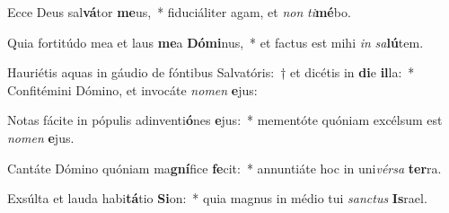 \item Ecce Deus sal\textbf{vá}tor \textbf{me}us,~* fiduciáliter agam, et \textit{non} \textit{ti}\textbf{mé}bo.
\item Quia fortitúdo mea et laus \textbf{me}a \textbf{Dó}\textbf{mi}nus,~* et factus est mihi \textit{in} \textit{sa}\textbf{lú}tem.
\item Hauriétis aquas in gáudio de fóntibus Salvatóris:~† et dicétis in \textbf{di}e \textbf{il}la:~* Confitémini Dómino, et invocáte \textit{no}\textit{men} \textbf{e}jus:
\item Notas fácite in pópulis adinventi\textbf{ó}nes \textbf{e}jus:~* mementóte quóniam excélsum est \textit{no}\textit{men} \textbf{e}jus.
\item Cantáte Dómino quóniam ma\textbf{gní}fice \textbf{fe}cit:~* annuntiáte hoc in uni\textit{vér}\textit{sa} \textbf{ter}ra.
\item Exsúlta et lauda habi\textbf{tá}tio \textbf{Si}on:~* quia magnus in médio tui \textit{sanc}\textit{tus} \textbf{Is}rael.
